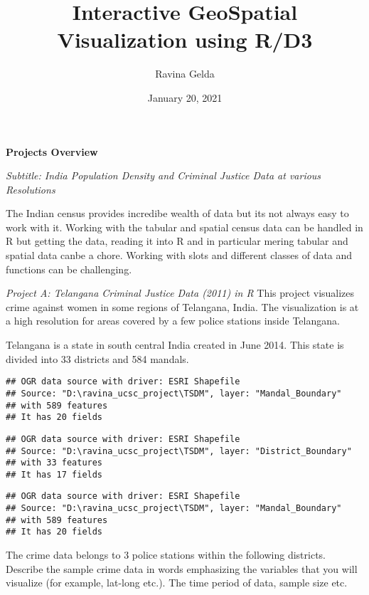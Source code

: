 \documentclass[
]{article}
\title{Interactive GeoSpatial Visualization using R/D3}
\author{Ravina Gelda}
\date{January 20, 2021}
\begin{document}
\maketitle

\textbf{Projects Overview}

\emph{Subtitle: India Population Density and Criminal Justice Data at
various Resolutions}

The Indian census provides incredibe wealth of data but its not always
easy to work with it. Working with the tabular and spatial census data
can be handled in R but getting the data, reading it into R and in
particular mering tabular and spatial data canbe a chore. Working with
slots and different classes of data and functions can be challenging.

\emph{Project A: Telangana Criminal Justice Data (2011) in R} This
project visualizes crime against women in some regions of Telangana,
India. The visualization is at a high resolution for areas covered by a
few police stations inside Telangana.

Telangana is a state in south central India created in June 2014. This
state is divided into 33 districts and 584 mandals.

\begin{verbatim}
## OGR data source with driver: ESRI Shapefile 
## Source: "D:\ravina_ucsc_project\TSDM", layer: "Mandal_Boundary"
## with 589 features
## It has 20 fields
\end{verbatim}

\begin{verbatim}
## OGR data source with driver: ESRI Shapefile 
## Source: "D:\ravina_ucsc_project\TSDM", layer: "District_Boundary"
## with 33 features
## It has 17 fields
\end{verbatim}

\hypertarget{htmlwidget-f74aad7c099f49d6eb2c}{}

\begin{verbatim}
## OGR data source with driver: ESRI Shapefile 
## Source: "D:\ravina_ucsc_project\TSDM", layer: "Mandal_Boundary"
## with 589 features
## It has 20 fields
\end{verbatim}

\hypertarget{htmlwidget-98a77937f18e957a0a01}{}

The crime data belongs to 3 police stations within the following
districts. Describe the sample crime data in words emphasizing the
variables that you will visualize (for example, lat-long etc.). The time
period of data, sample size etc.
\end{document}
